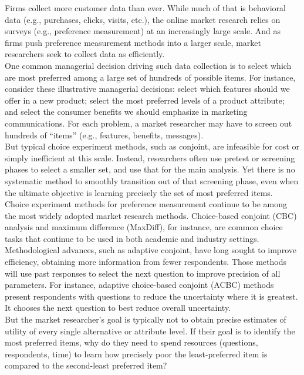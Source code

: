 \documentclass[mksc,blindrev]{informs3} %
\begin{document}
Firms collect more customer data than ever. While much of that is behavioral data (e.g., purchases, clicks, visits, etc.), the online market research relies on surveys (e.g., preference measurement) at an increasingly large scale. And as firms push preference measurement methods into a larger scale, market researchers seek to collect data as efficiently. \\
One common managerial decision driving such data collection is to select which are most preferred among a large set of hundreds of possible items. For instance, consider these illustrative managerial decisions: select which features should we offer in a new product; select the most preferred levels of a product attribute; and select the consumer benefits we should emphasize in marketing communications.  For each problem, a market researcher may have to screen out hundreds of “items” (e.g., features, benefits, messages).\\
But typical choice experiment methods, such as conjoint, are infeasible for cost or simply inefficient at this scale. Instead, researchers often use pretest or screening phases to select a smaller set, and use that for the main analysis. Yet there is no systematic method to smoothly transition out of that screening phase, even when the ultimate objective is learning precisely the set of most preferred items. \\
Choice experiment methods for preference measurement continue to be among the most widely adopted market research methods. Choice-based conjoint (CBC) analysis and maximum difference (MaxDiff), for instance, are common choice tasks that continue to be used in both academic and industry settings.\\
Methodological advances, such as adaptive conjoint, have long sought to improve efficiency, obtaining more information from fewer respondents. Those methods will use past responses to select the next question to improve precision of all parameters. For instance, adaptive choice-based conjoint (ACBC) methods present respondents with questions to reduce the uncertainty where it is greatest. It chooses the next question to best reduce overall uncertainty.\\
But the market researcher’s goal is typically not to obtain precise estimates of utility of every single alternative or attribute level. If their goal is to identify the most preferred items, why do they need to spend resources (questions, respondents, time) to learn how precisely poor the least-preferred item is compared to the second-least preferred item? \\
\end{document}
